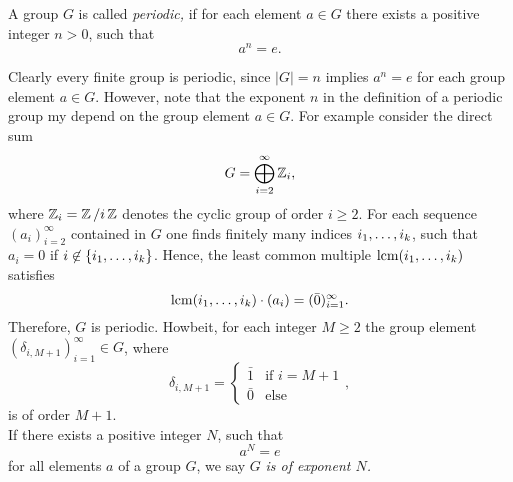 \begin{defin}
A group $G$ is called \emph{periodic,} if for each element $a\in G$ there exists a positive integer $n>0$, such that
\begin{equation*}
a^n=e.
\end{equation*}
\end{defin}
Clearly every finite group is periodic, since $\lvert G\rvert=n$ implies $a^n=e$ for each group element $a\in G$. However, note that the exponent $n$ in the definition of a periodic group my depend on the group element $a\in G$. For example consider the direct sum
\begin{equation*}
G=\bigoplus_{i=2}^\infty \Z_i,
\end{equation*}
where $\Z_i=\nicefrac{\Z}{i\Z}$ denotes the cyclic group of order $i\geq 2$. For each sequence $(a_i)_{i=2}^\infty$ contained in $G$ one finds finitely many indices $\seq[k]{i}$, such that $a_i=0$ if $i\not\in\lbrace\seq[k]{i}\rbrace$. Hence, the least common multiple $\lcm(\seq[k]{i})$ satisfies
\begin{equation*}
\lcm(\seq[k]{i})\cdot(a_i)=(\bar{0})_{i=1}^\infty.
\end{equation*}
Therefore, $G$ is periodic. Howbeit, for each integer $M\geq 2$ the group element $(\delta_{i,M+1})_{i=1}^\infty\in G$, where
\begin{equation*}
\delta_{i,M+1}=\begin{cases} \bar{1} &\text{if }i=M+1\\ \bar{0}&\text{else}\end{cases},
\end{equation*}
is of order $M+1$.\\
If there exists a positive integer $N$, such that
\begin{equation*}
a^N=e
\end{equation*}
for all elements $a$ of a group $G$, we say $G$ \emph{is of exponent $N$.}\\

